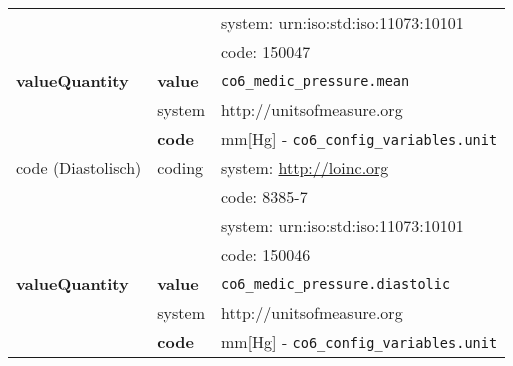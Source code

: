 \begin{longtable}{|l|l|p{7.5cm}|}
	&  & system: urn:iso:std:iso:11073:10101 \\ 
	\cline{3-3}
	&  & code: 150047 \\ \hline	
	\textbf{valueQuantity} & \textbf{value} & \texttt{co6\_medic\_pressure.mean} \\
	\cline{2-3}
	& system & http://unitsofmeasure.org \\ 
	\cline{2-3}
	& \textbf{code} &  mm[Hg] - \texttt{co6\_config\_variables.unit} \\ \hline
	code (Diastolisch) & coding & system: \url{http://loinc.org} \\ 
	\cline{3-3} 
	&  & code: 8385-7 \\ 
	\cline{3-3}
	&  & system: urn:iso:std:iso:11073:10101 \\ 
	\cline{3-3}
	&  & code: 150046 \\ \hline
	\textbf{valueQuantity} & \textbf{value} & \texttt{co6\_medic\_pressure.diastolic} \\
	\cline{2-3}
	& system & http://unitsofmeasure.org \\ 
	\cline{2-3}
	& \textbf{code} & mm[Hg] - \texttt{co6\_config\_variables.unit} \\ \hline
\end{longtable}
